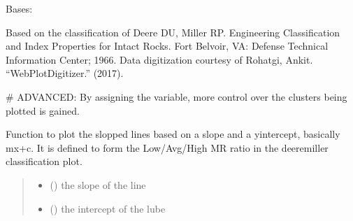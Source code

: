 \documentclass[letterpaper,10pt,english]{sphinxmanual}
\begin{document}
\begin{fulllineitems}
\label{\detokenize{pyrockmodulus:pyrockmodulus.pyrockmodulus.modulus_ratio}}
\pysigstartsignatures
{}
\pysigstopsignatures
\sphinxAtStartPar
Bases: 

\sphinxAtStartPar
Based on the classification of Deere DU, Miller RP. Engineering Classification and Index Properties for Intact Rocks. Fort Belvoir, VA: Defense Technical Information Center; 1966.
Data digitization courtesy of Rohatgi, Ankit. “WebPlotDigitizer.” (2017).

\sphinxAtStartPar
\# ADVANCED: By assigning the  variable, more control over the clusters being plotted is gained.

\begin{fulllineitems}
\label{\detokenize{pyrockmodulus:pyrockmodulus.pyrockmodulus.modulus_ratio.abline}}
\pysigstartsignatures
{}
\pysigstopsignatures
\sphinxAtStartPar
Function to plot the slopped lines based on a slope and a y\sphinxhyphen{}intercept, basically mx+c. It is defined to form the Low/Avg/High MR ratio in the deere\sphinxhyphen{}miller classification plot.
\begin{quote}\begin{description}
\begin{itemize}
\item {} 
\sphinxAtStartPar
{} () \textendash{} the slope of the line

\item {} 
\sphinxAtStartPar
{} () \textendash{} the intercept of the lube


\end{itemize}
\end{description}
\end{quote}
\end{fulllineitems}
\end{fulllineitems}
\end{document}
